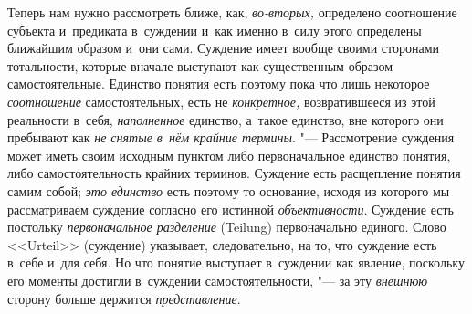 Теперь нам нужно рассмотреть ближе, как, {\em во-вторых,}
определено соотношение субъекта и~предиката в~суждении и~как
именно в~силу этого определены ближайшим образом и~они сами. Суждение имеет
вообще своими сторонами тотальности, которые вначале выступают как
существенным образом самостоятельные. Единство понятия есть поэтому пока
что лишь некоторое {\em соотношение} самостоятельных, есть не
{\em конкретное,} возвратившееся из этой реальности в~себя, {\em наполненное}
единство, а~такое единство, вне которого они пребывают как {\em не снятые
в~нём крайние термины}. "--- Рассмотрение суждения может иметь своим
исходным пунктом либо первоначальное единство понятия, либо
самостоятельность крайних терминов. Суждение есть расщепление понятия самим
собой; {\em это единство} есть поэтому то основание, исходя из которого мы
рассматриваем суждение согласно его истинной {\em объективности}.
Суждение есть постольку {\em первоначальное разделение}
(Teilung) первоначально единого. Слово <<Urteil>> (суждение)
указывает, следовательно, на то, что суждение есть в~себе и~для себя. Но
что понятие выступает в~суждении как явление, поскольку его моменты
достигли в~суждении самостоятельности, "--- за эту {\em внешнюю} сторону
больше держится {\em представление}.

